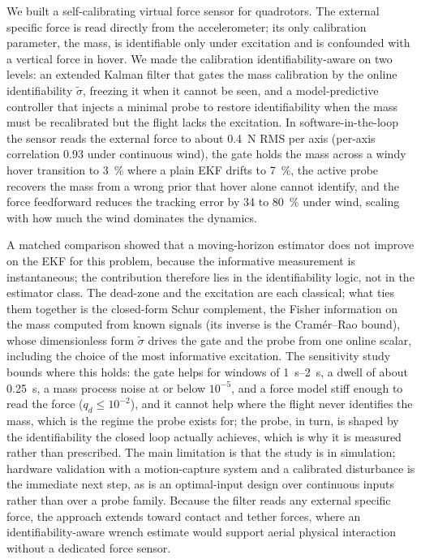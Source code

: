 \documentclass{ieeeaccess}
\begin{document}
We built a self-calibrating virtual force sensor for quadrotors. The external
specific force is read directly from the accelerometer; its only calibration
parameter, the mass, is identifiable only under excitation and is confounded with a
vertical force in hover. We made the calibration identifiability-aware on two levels:
an extended Kalman filter that gates the mass calibration by the online
identifiability $\tilde\sigma$, freezing it when it cannot be seen, and a
model-predictive controller that injects a minimal probe to restore identifiability
when the mass must be recalibrated but the flight lacks the excitation. In
software-in-the-loop the sensor reads the external force to about \SI{0.4}{\newton}
RMS per axis (per-axis correlation \num{0.93} under continuous wind), the gate holds
the mass across a windy hover transition to \SI{3}{\percent} where a plain EKF drifts to
\SI{7}{\percent}, the active probe
recovers the mass from a wrong prior that hover alone cannot identify, and the
force feedforward reduces the tracking error by \SI{34}{} to \SI{80}{\percent}
under wind, scaling with how much the wind dominates the dynamics.

A matched comparison showed that a moving-horizon estimator does not improve on
the EKF for this problem, because the informative measurement is instantaneous;
the contribution therefore lies in the identifiability logic, not in the estimator
class. The dead-zone and the excitation are each classical; what ties them together
is the closed-form Schur complement, the Fisher information on the mass computed from
known signals (its inverse is the Cram\'er--Rao bound), whose dimensionless form
$\tilde\sigma$ drives the gate and the probe from one online scalar, including the
choice of the most informative excitation. The sensitivity study bounds where this holds: the gate helps for windows of
\SIrange{1}{2}{\second}, a dwell of about \SI{0.25}{\second}, a mass process
noise at or below $10^{-5}$, and a force model stiff enough to read the force
($q_d\le10^{-2}$), and it cannot help where the flight never identifies the
mass, which is the regime the probe exists for; the probe, in turn, is shaped by
the identifiability the closed loop actually achieves, which is why it is
measured rather than prescribed. The main
limitation is that the study is in simulation; hardware validation with a
motion-capture system and a calibrated disturbance is the immediate next step, as
is an optimal-input design over continuous inputs rather than over a probe family.
Because the filter reads any external specific force, the approach extends toward
contact and tether forces, where an identifiability-aware wrench estimate would
support aerial physical interaction~\cite{ollero2022past,augugliaro2013admittance} without a dedicated force sensor.
\end{document}
